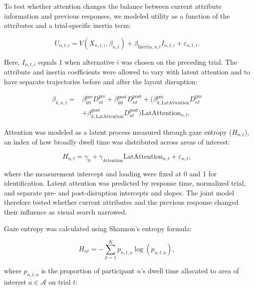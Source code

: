 \documentclass[man,natbib,floatsintext]{apa7}
\begin{document}
To test whether attention changes the balance between current attribute information and previous responses, we modeled utility as a function of the attributes and a trial-specific inertia term:

\begin{equation}
U_{n,t,i} =
V(X_{n,t,i}, \beta_{n,t})
+ \beta_{\text{Inertia},n,t} I_{n,t,i}
+ \varepsilon_{n,t,i}.
\end{equation}

Here, $I_{n,t,i}$ equals 1 when alternative $i$ was chosen on the preceding trial. The attribute and inertia coefficients were allowed to vary with latent attention and to have separate trajectories before and after the layout disruption:

\begin{equation}
\begin{split}
    \beta_{k,n,t} =&\beta_{k0}^{\mathrm{pre}}D^{\mathrm{pre}}_{nt} +\beta_{k0}^{\mathrm{post}}D^{\mathrm{post}}_{nt} + \biggl( \beta_{k,\text{LatAttention}}^{\mathrm{pre}}D^{\mathrm{pre}}_{nt} \\
&+\beta_{k,\text{LatAttention}}^{\mathrm{post}}D^{\mathrm{post}}_{nt} \biggr)\text{LatAttention}_{n,t}.
\end{split}
\end{equation}

Attention was modeled as a latent process measured through gaze entropy ($H_{n,t}$), an index of how broadly dwell time was distributed across areas of interest:

\begin{equation}
H_{n,t} =\gamma_0+\gamma_{\text{Attention}}\text{LatAttention}_{n,t} + \varepsilon_{n,t},
\end{equation}

where the measurement intercept and loading were fixed at 0 and 1 for identification. Latent attention was predicted by response time, normalized trial, and separate pre- and post-disruption intercepts and slopes. The joint model therefore tested whether current attributes and the previous response changed their influence as visual search narrowed.

Gaze entropy was calculated using Shannon's entropy formula:

\begin{equation}
    H_{nt}=
    -\sum_{k=1}^{K} p_{n,t,a}\log\left(p_{n,t,a}\right),
\label{eq:shannon_entropy}
\end{equation}

where $p_{n,t,a}$ is the proportion of participant $n$'s dwell time allocated to area of interest $a\in \mathcal{A}$ on trial $t$:
\end{document}
